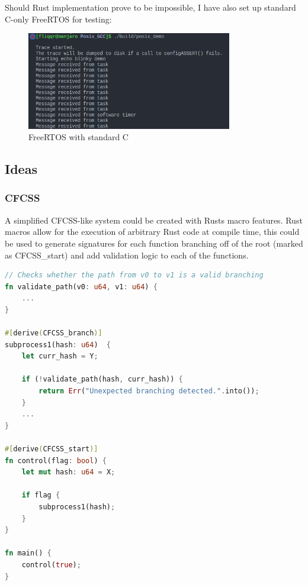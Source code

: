 \documentclass[12pt, letterpaper]{article}
\begin{document}
Should Rust implementation prove to be impossible, I have also set up standard C-only FreeRTOS for testing:

\begin{figure}[hbt]
    \centering
    \includegraphics[width=0.8\textwidth]{diagrams/screenshots/freertos-c-example.png}
    \caption{FreeRTOS with standard C}
    \label{fig:freertos-c}
\end{figure}

\subsection{Ideas}

\subsubsection{CFCSS}

A simplified CFCSS-like system could be created with Rusts macro features. Rust macros allow for the execution of arbitrary Rust code at compile time, this could be used to generate signatures for each function branching off of the root (marked as CFCSS\_start) and add validation logic to each of the functions.

\begin{lstlisting}[language=Rust]
// Checks whether the path from v0 to v1 is a valid branching
fn validate_path(v0: u64, v1: u64) {
    ...
}

#[derive(CFCSS_branch)]
subprocess1(hash: u64)  {
    let curr_hash = Y;

    if (!validate_path(hash, curr_hash)) {
        return Err("Unexpected branching detected.".into());
    }
    ...
}

#[derive(CFCSS_start)]
fn control(flag: bool) {
    let mut hash: u64 = X;

    if flag {
        subprocess1(hash);
    }
}

fn main() {
    control(true);
}
\end{lstlisting}
\end{document}
